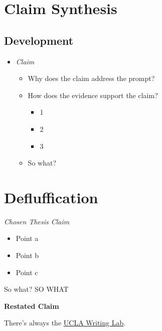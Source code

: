 \documentclass[11pt]{article}
\begin{document}
\section{Claim Synthesis}
\label{sec:orga525c90}

\subsection{Development}
\label{sec:org2665f8b}
\begin{itemize}
\item \emph{Claim}
\begin{itemize}
\item Why does the claim address the prompt?
\item How does the evidence support the claim?
\begin{itemize}
\item 1
\item 2
\item 3
\end{itemize}
\item So what?
\end{itemize}
\end{itemize}

\section{Defluffication}
\label{sec:org4aee1ee}
\emph{Chosen Thesis Claim}

\begin{itemize}
\item Point a
\item Point b
\item Point c
\end{itemize}

So what? SO WHAT

\textbf{Restated Claim}


There's always the \href{https://wp.ucla.edu/wp-content/uploads/2016/01/UWC\_handouts\_What-How-So-What-Thesis-revised-5-4-15-RZ.pdf}{UCLA Writing Lab}.
\end{document}
